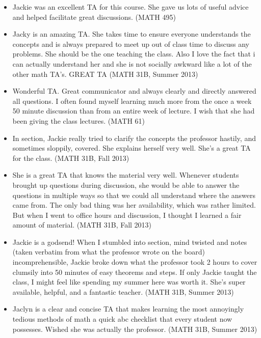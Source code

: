 \documentclass[11pt]{article}
\theoremstyle{plain} \numberwithin{equation}{section}
\theoremstyle{definition}
\newcounter{list}
\begin{document}
{\begin{description}
\begin{itemize}
		\item Jackie was an excellent TA for this course.  She gave us lots of useful advice and helped facilitate great discussions.  (MATH 495)
		\item Jacky is an amazing TA.  She takes time to ensure everyone understands the concepts and is always prepared to meet up out of class time to discuss any problems.  She should be the one teaching the class.  Also I love the fact that i can actually understand her and she is not socially awkward like a lot of the other math TA's.  GREAT TA (MATH 31B, Summer 2013)
	\end{itemize}

    \item[\normalsize{Communication Skills}]  
    	\begin{itemize}
		\item Wonderful TA.  Great communicator and always clearly and directly answered all questions.  I often found myself learning much more from the once a week 50 minute discussion than from an entire week of lecture.  I wish that she had been giving the class lectures. (MATH 61)
		\item In section, Jackie really tried to clarify the concepts the professor hastily, and sometimes sloppily, covered.  She explains herself very well.  She's a great TA for the class.  (MATH 31B, Fall 2013)
		\item She is a great TA that knows the material very well.  Whenever students brought up questions during discussion, she would be able to answer the questions in multiple ways so that we could all understand where the answers came from.  The only bad thing was her availability, which was rather limited.  But when I went to office hours and discussion, I thought I learned a fair amount of material.  (MATH 31B, Fall 2013)
		\item Jackie is a godsend!  When I stumbled into section, mind twisted and notes (taken verbatim from what the professor wrote on the board) incomprehensible, Jackie broke down what the professor took 2 hours to cover clumsily into 50 minutes of easy theorems and steps.  If only Jackie taught the class, I might feel like spending my summer here was worth it.  She's super available, helpful, and a fantastic teacher.  (MATH 31B, Summer 2013)
		\item Jaclyn is a clear and concise TA that makes learning the most annoyingly tedious methods of math a quick abc checklist that every student now possesses.  Wished she was actually the professor.  (MATH 31B, Summer 2013)

\end{itemize}
\end{description}}
\end{document}

